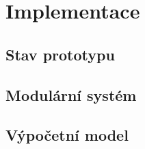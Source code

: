 \chapter{Implementace}
\section{Stav prototypu}
\section{Modulární systém}
\section{Výpočetní model}
